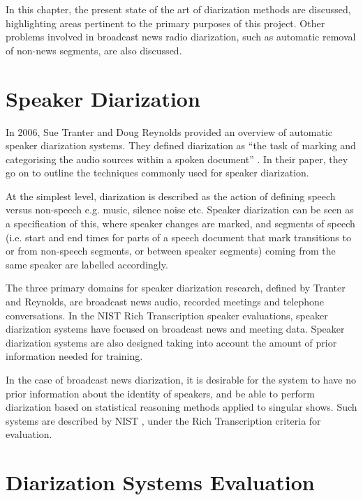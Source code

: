\doublespacing
In this chapter, the present state of the art of diarization methods are discussed, highlighting areas pertinent to the primary purposes of this project. Other problems involved in broadcast news radio diarization, such as automatic removal of non-news segments, are also discussed.

\singlespacing
\section{Speaker Diarization}

\doublespacing
In 2006, Sue Tranter and Doug Reynolds provided an overview of automatic speaker diarization systems. They defined diarization as ``the task of marking and categorising the audio sources within a spoken document'' \cite{tranter2006overview}. In their paper, they go on to outline the techniques commonly used for speaker diarization.  \par
At the simplest level, diarization is described as the action of defining speech versus non-speech e.g. music, silence noise etc. Speaker diarization can be seen as a specification of this, where speaker changes are marked, and segments of speech (i.e. start and end times for parts of a speech document that mark transitions to or from non-speech segments, or between speaker segments) coming from the same speaker are labelled accordingly. \par
The three primary domains for speaker diarization research, defined by Tranter and Reynolds, are broadcast news audio, recorded meetings and telephone conversations. In the NIST Rich Transcription speaker evaluations, speaker diarization systems have focused on broadcast news and meeting data. Speaker diarization systems are also designed taking into account the amount of prior information needed for training. \par
In the case of broadcast news diarization, it is desirable for the system to have no prior information about the identity of speakers, and be able to perform diarization based on statistical reasoning methods applied to singular shows. Such systems are described by NIST \cite{NIST2006web}, under the Rich Transcription criteria for evaluation. \par

\singlespacing
\section{Diarization Systems Evaluation}

